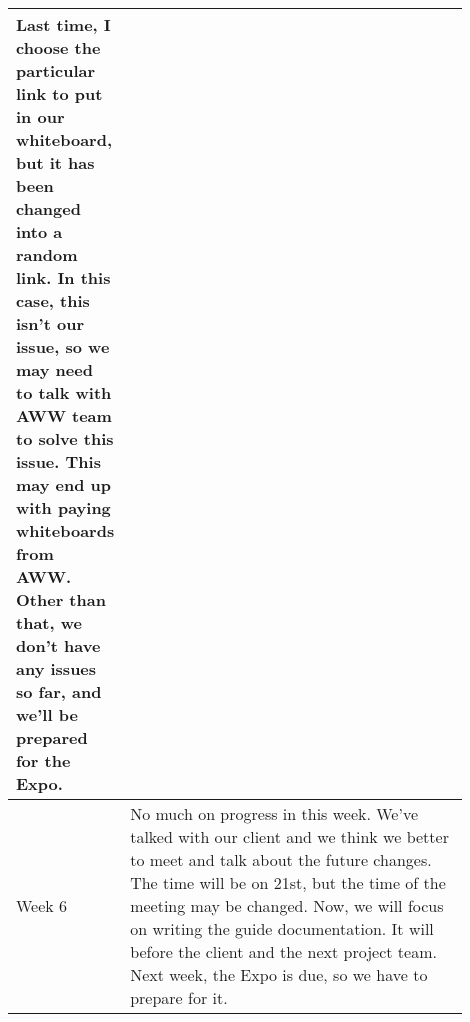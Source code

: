 \documentclass[10pt]{article}
\begin{document}
\begin{center}
\begin{tabular}{ | p{0.1\linewidth} | p{0.8\linewidth} | }
            Last time, I choose the particular link to put in our whiteboard, but it has been changed into a random link.
            In this case, this isn't our issue, so we may need to talk with AWW team to solve this issue.
            This may end up with paying whiteboards from AWW.
            Other than that, we don't have any issues so far, and we'll be prepared for the Expo. \\ \hline 
            Week 6 & No much on progress in this week.
            We've talked with our client and we think we better to meet and talk about the future changes.
            The time will be on 21st, but the time of the meeting may be changed.
            Now, we will focus on writing the guide documentation. 
            It will before the client and the next project team.
            Next week, the Expo is due, so we have to prepare for it.   \\ \hline 
        \end{tabular}
        \end{center}        
\end{document}
